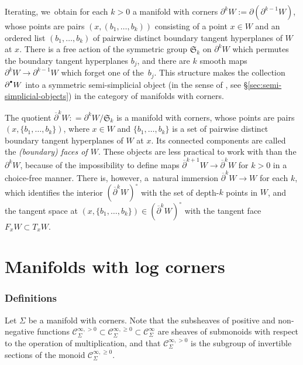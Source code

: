 \documentclass[JEP,XML,SOM,Unicode,NoFloatCountersInSection,published]{cedram}
\let\oldbullet\bullet
\renewcommand{\bullet}{{\raisebox{1pt}{$\scriptscriptstyle\oldbullet$}}}
\theoremstyle{definition}
\theoremstyle{remark}
\let\defn\emph
\renewcommand{\ge}{\geqslant}
\newcommand{\defas}{\mathrel{\mathop:}=}
\newcommand{\Cinf}[1]{\mathscr{C}^{\infty}_{#1}}
\newcommand{\Cinfpos}[1]{\mathscr{C}^{\infty, > 0}_{#1}}
\newcommand{\Cinfge}[1]{\mathscr{C}^{\infty, \ge 0}_{#1}}
\newcommand{\Sig}{\Sigma}
\newcommand{\tb}[2][]{T_{#1}#2}
\begin{document}
Iterating, we~obtain for each $k>0$ a manifold with corners $\partial^{k} W:=\partial (\partial^{k-1}W)$, whose points are pairs $(x,(b_1,\ldots,b_k))$ consisting of a point $x\in W$ and an ordered list $(b_1,\ldots,b_k)$ of pairwise distinct boundary tangent hyperplanes of $ W$ at $x$. There is a free action of the symmetric group $\mathfrak{S}_k$ on $\partial^k W$ which permutes the boundary tangent hyperplanes $b_j$, and there are $k$ smooth maps $\partial^k W\to \partial^{k-1} W$ which forget one of the~$b_j$. This structure makes the collection $\partial^\bullet W$ into a symmetric semi-simplicial object (in the sense of \cite{ChanGalatiusPayne}, see \S\ref{sec:semi-simplicial-objects}) in the category of manifolds with corners.

The quotient $
\overline{\partial}^k W \defas \partial^k W/\mathfrak{S}_k$ is a manifold with corners, whose points are pairs $(x,\{b_1,\ldots,b_k\})$, where $x\in W$ and $\{b_1,\ldots,b_k\}$ is a set of pairwise distinct boundary tangent hyperplanes of $ W$ at $x$. Its connected components are called the \defn{(boundary) faces of $W$}. These objects are less practical to work with than the $\partial^k W$, because of the impossibility to define maps $\overline{\partial}^{k+1} W\to \overline{\partial}^{k} W$ for $k > 0$ in a choice-free manner. There is, however, a~natural immersion $\overline{\partial}^k W\to W$ for each $k$, which identifies the interior $(\overline{\partial}^kW)^\circ$ with the set of depth-$k$ points in $W$, and the tangent space at $(x,\{b_1,\ldots,b_k\})\in (\overline{\partial}^kW)^\circ$ with the tangent face $F_xW\subset \tb[x]{W}$.

\section{Manifolds with log corners}\label{sec:log-corners}

\label{sec:log-structures}

\subsubsection{Definitions}

Let $\Sig$ be a manifold with corners. Note that the subsheaves of positive and non-negative functions $\Cinfpos{\Sig} \subset \Cinfge{\Sig} \subset \Cinf{\Sig}$
are sheaves of submonoids with respect to the operation of multiplication, and that $\Cinfpos{\Sig}$ is the subgroup of invertible sections of the monoid $\Cinfge{\Sig}$.
\end{document}
